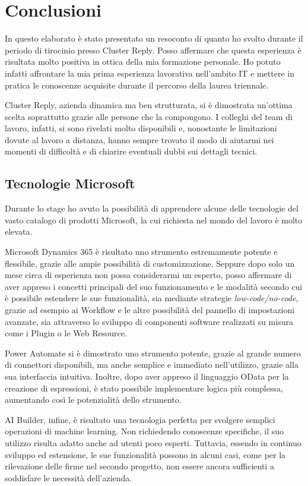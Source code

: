 \graphicspath{{./chapters/05/assets/}}
\chapter{Conclusioni}
In questo elaborato è stato presentato un resoconto di quanto ho svolto durante il periodo di tirocinio presso Cluster Reply. Posso affermare che questa esperienza è risultata molto positiva in ottica della mia formazione personale. Ho potuto infatti affrontare la mia prima esperienza lavorativa nell'ambito IT e mettere in pratica le conoscenze acquisite durante il percorso della laurea triennale. 

Cluster Reply, azienda dinamica ma ben strutturata, si è dimostrata un'ottima scelta soprattutto grazie alle persone che la compongono. I colleghi del team di lavoro, infatti, si sono rivelati molto disponibili e, nonostante le limitazioni dovute al lavoro a distanza, hanno sempre trovato il modo di aiutarmi nei momenti di difficoltà e di chiarire eventuali dubbi sui dettagli tecnici. 

\section{Tecnologie Microsoft}
Durante lo stage ho avuto la possibilità di apprendere alcune delle tecnologie del vasto catalogo di prodotti Microsoft, la cui richiesta nel mondo del lavoro è molto elevata. 

Microsoft Dynamics 365 è risultato uno strumento estremamente potente e flessibile, grazie alle ampie possibilità di customizzazione. Seppure dopo solo un mese circa di esperienza non possa considerarmi un esperto, posso affermare di aver appreso i concetti principali del suo funzionamento e le modalità secondo cui è possibile estendere le sue funzionalità, sia mediante strategie \textit{low-code/no-code}, grazie ad esempio ai Workflow e le altre possibilità del pannello di impostazioni avanzate, sia attraverso lo sviluppo di componenti software realizzati su misura come i Plugin o le Web Resource. 

Power Automate si è dimostrato uno strumento potente, grazie al grande numero di connettori disponibili, ma anche semplice e immediato nell'utilizzo, grazie alla sua interfaccia intuitiva. Inoltre, dopo aver appreso il linguaggio OData per la creazione di espressioni, è stato possibile implementare logica più complessa, aumentando così le potenzialità dello strumento.

AI Builder, infine, è risultato una tecnologia perfetta per svolgere semplici operazioni di machine learning. Non richiedendo conoscenze specifiche, il suo utilizzo risulta adatto anche ad utenti poco esperti. Tuttavia, essendo in continuo sviluppo ed estensione, le sue funzionalità possono in alcuni casi, come per la rilevazione delle firme nel secondo progetto, non essere ancora sufficienti a soddisfare le necessità dell'azienda. 


